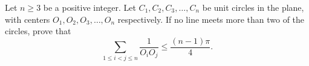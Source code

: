 Let $n \geq 3$ be a positive integer. Let $C_1, C_2, C_3, \ldots, C_n$ be unit circles in the plane, with centers $O_1, O_2, O_3, \ldots, O_n$ respectively. If no line meets more than two of the circles, prove that
\[ \sum_{1 \leq i < j \leq n} \frac{1}{O_iO_j} \leq \frac{(n-1)\pi}{4}. \]
